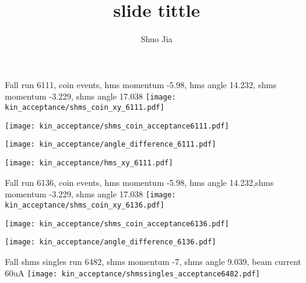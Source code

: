 \documentclass[aspectratio=169,xcolor=dvipsnames]{beamer}
\title{slide tittle}
\date{}
\author{Shuo Jia}
\begin{document}
\maketitle





\begin{frame}{}
  Fall run 6111, coin events, hms momentum -5.98, hms angle 14.232,  shms momentum -3.229, shms angle 17.038
  \texttt{[image: kin\_acceptance/shms\_coin\_xy\_6111.pdf]}
\end{frame}

\begin{frame}{}
  \texttt{[image: kin\_acceptance/shms\_coin\_acceptance6111.pdf]}
\end{frame}

\begin{frame}{}
  \texttt{[image: kin\_acceptance/angle\_difference\_6111.pdf]}
\end{frame}

\begin{frame}{}
  \texttt{[image: kin\_acceptance/hms\_xy\_6111.pdf]}
\end{frame}

\begin{frame}{}
  Fall run 6136, coin events, hms momentum -5.98, hms angle 14.232,shms momentum -3.229, shms angle 17.038
  \texttt{[image: kin\_acceptance/shms\_coin\_xy\_6136.pdf]}
\end{frame}

\begin{frame}{}
  \texttt{[image: kin\_acceptance/shms\_coin\_acceptance6136.pdf]}
\end{frame}

\begin{frame}{}
  \texttt{[image: kin\_acceptance/angle\_difference\_6136.pdf]}
\end{frame}

\begin{frame}{}
  Fall shms singles run 6482, shms momentum -7, shms angle 9.039, beam current 60uA
  \texttt{[image: kin\_acceptance/shmssingles\_acceptance6482.pdf]}
\end{frame}  
\end{document}
